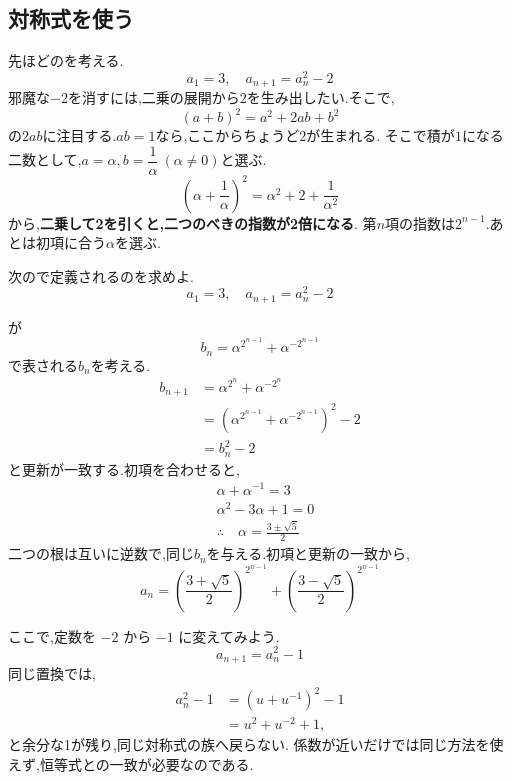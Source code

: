 \subsection{対称式を使う}\label{節：対称式を使う}
先ほどのを考える.
\[
  a_1=3, \quad a_{n+1}=a_n^2-2
\]
邪魔な$-2$を消すには,二乗の展開から$2$を生み出したい.そこで,
\[
  (a+b)^2=a^2+2ab+b^2
\]
の$2ab$に注目する.$ab=1$なら,ここからちょうど$2$が生まれる.
そこで積が$1$になる二数として,$a=\alpha,b=\dfrac{1}{\alpha}\ (\alpha\ne0)$と選ぶ.
\[
  \left(\alpha+\frac{1}{\alpha}\right)^2=\alpha^2+2+\frac{1}{\alpha^2}
\]
から,\textbf{二乗して2を引くと,二つのべきの指数が2倍になる}.
第$n$項の指数は$2^{n-1}$.あとは初項に合う$\alpha$を選ぶ.

\noindent {}\par\nobreak
\begin{smallquote}
  次ので定義されるのを求めよ.
  \[
    a_1=3, \quad a_{n+1}=a_n^2-2
  \]
\end{smallquote}
\begin{smallquote}
  が
  \[
    b_n=\alpha^{2^{n-1}}+\alpha^{-2^{n-1}}
  \]
  で表される$b_n$を考える.
  \begin{align*}
    b_{n+1}&=\alpha^{2^{n}}+\alpha^{-2^{n}}\\
    &=\left(\alpha^{2^{n-1}}+\alpha^{-2^{n-1}}\right)^2-2\\
    &=b_n^2-2
  \end{align*}
  と更新が一致する.初項を合わせると,
  \begin{align*}
    &\alpha+\alpha^{-1}=3\\
    &\alpha^2-3\alpha+1=0\\
    &\therefore \quad \alpha=\frac{3\pm \sqrt{5}}{2}
  \end{align*}
  二つの根は互いに逆数で,同じ$b_n$を与える.初項と更新の一致から,
  \[
    a_n=\left(\frac{3+ \sqrt{5}}{2}\right)^{2^{n-1}}+\left(\frac{3- \sqrt{5}}{2}\right)^{2^{n-1}}
  \]
\end{smallquote}

ここで,定数を $-2$ から $-1$ に変えてみよう.
\[
  a_{n+1}=a_n^2-1
\]
同じ置換では,
\begin{align*}
  a_n^2-1
  &=\left(u+u^{-1}\right)^2-1\\
  &=u^2+u^{-2}+1,
\end{align*}
と余分な1が残り,同じ対称式の族へ戻らない.
係数が近いだけでは同じ方法を使えず,恒等式との一致が必要なのである.

